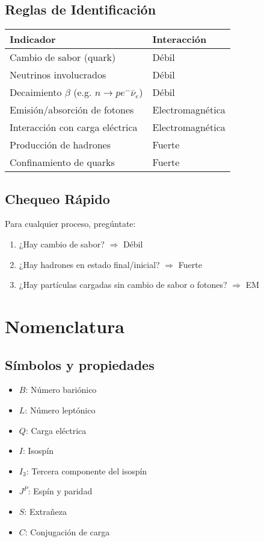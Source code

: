 \documentclass[10pt,twocolumn]{article}
\begin{document}
\subsection*{Reglas de Identificación}

\begin{supertabular}{|l|l|}
\hline
{} 
\textbf{Indicador} & \textbf{Interacción} \\
\hline
Cambio de sabor (quark) & Débil \\
Neutrinos involucrados & Débil \\
Decaimiento $\beta$ (e.g. $n \to p e^- \bar{\nu}_e$) & Débil \\
Emisión/absorción de fotones & Electromagnética \\
Interacción con carga eléctrica & Electromagnética \\
Producción de hadrones & Fuerte \\
Confinamiento de quarks & Fuerte \\
\hline
\end{supertabular}

\subsection*{Chequeo Rápido}

Para cualquier proceso, pregúntate:
\begin{enumerate}
\item ¿Hay cambio de sabor? $\Rightarrow$ Débil
\item ¿Hay hadrones en estado final/inicial? $\Rightarrow$ Fuerte
\item ¿Hay partículas cargadas sin cambio de sabor o fotones? $\Rightarrow$ EM
\end{enumerate}

\section*{Nomenclatura}

\subsection*{Símbolos y propiedades}
\begin{itemize}
\item $B$: Número bariónico
\item $L$: Número leptónico
\item $Q$: Carga eléctrica
\item $I$: Isospín
\item $I_3$: Tercera componente del isospín
\item $J^P$: Espín y paridad
\item $S$: Extrañeza
\item $C$: Conjugación de carga
\end{itemize}
\end{document}
